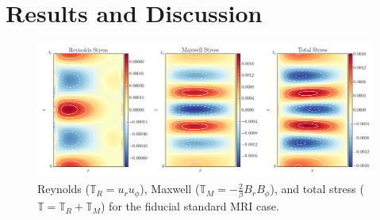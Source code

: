 \documentclass{emulateapj}
\begin{document}

\section{Results and Discussion}

\begin{figure}
\centering
\includegraphics[width=\textwidth]{../figures/widegap_rey_max_tot_stresses.png}
\caption{Reynolds ($\mathbb{T}_{R} = u_r u_\phi$), Maxwell ($\mathbb{T}_{M} = -\frac{2}{\beta} B_r B_\phi$), and total stress ($\mathbb{T} = \mathbb{T}_{R} + \mathbb{T}_{M}$) for the fiducial standard MRI case. }
\end{figure}
\end{document}
